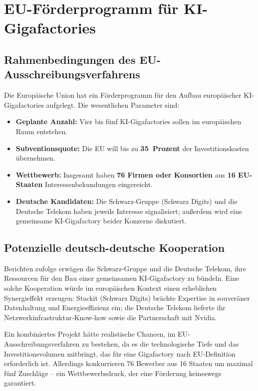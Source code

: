 \documentclass[12pt, a4paper, openany]{report}
\begin{document}
\section{EU-Förderprogramm für KI-Gigafactories}
\label{sec:eu_gigafactory}

\subsection{Rahmenbedingungen des EU-Ausschreibungsverfahrens}

Die Europäische Union hat ein Förderprogramm für den Aufbau europäischer
KI-Gigafac\-tories aufgelegt. Die wesentlichen Parameter sind:

\begin{itemize}[leftmargin=2em]
	\item \textbf{Geplante Anzahl:} Vier bis fünf KI-Gigafac\-tories sollen im
	europäischen Raum entstehen.
	\item \textbf{Subventionsquote:} Die EU will bis zu \textbf{35~Prozent}
	der Investitionskosten übernehmen.
	\item \textbf{Wettbewerb:} Insgesamt haben \textbf{76 Firmen oder Konsortien}
	aus \textbf{16 EU-Staaten} Interessenbekundungen eingereicht.
	\item \textbf{Deutsche Kandidaten:} Die Schwarz-Gruppe (Schwarz Digits)
	und die Deutsche Telekom haben jeweils Interesse signalisiert;
	außerdem wird eine gemeinsame KI-Gigafactory beider Konzerne diskutiert.
\end{itemize}

\subsection{Potenzielle deutsch-deutsche Kooperation}

Berichten zufolge erwägen die Schwarz-Gruppe und die Deutsche Telekom,
ihre Ressourcen für den Bau einer gemeinsamen KI-Gigafactory zu bündeln.
Eine solche Kooperation würde im europäischen Kontext einen erheblichen
Synergieffekt erzeugen: Stackit (Schwarz Digits) brächte Expertise in
souveräner Datenhaltung und Energieeffizienz ein; die Deutsche Telekom
lieferte ihr Netzwerkinfrastruktur-Know-how sowie die Partnerschaft
mit Nvidia.

Ein kombiniertes Projekt hätte realistische Chancen, im EU-Ausschreibungsverfahren
zu bestehen, da es die technologische Tiefe und das Investitionsvolumen
mitbringt, das für eine Gigafactory nach EU-Definition erforderlich ist.
Allerdings konkurrieren 76 Bewerber aus 16 Staaten um maximal fünf
Zuschläge -- ein Wettbewerbsdruck, der eine Förderung keineswegs garantiert.
\end{document}
